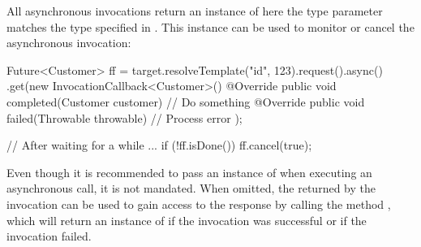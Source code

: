 All asynchronous invocations return an instance of  here the type parameter  matches the type specified in . This instance can be used to monitor or cancel the asynchronous invocation:

\begin{listing}{1}
Future<Customer> ff = target.resolveTemplate("id", 123).request().async()
    .get(new InvocationCallback<Customer>() {
        @Override
        public void completed(Customer customer) {
            // Do something
        }
        @Override
        public void failed(Throwable throwable) {
            // Process error
        }
    });

// After waiting for a while ...
if (!ff.isDone()) {
    ff.cancel(true);
} 
\end{listing}

Even though it is recommended to pass an instance of  when executing an asynchronous call, it is not mandated. When omitted, the  returned by the invocation can be used to gain access to the response by calling the method , which will return an instance of  if the invocation was successful or  if the invocation failed.






